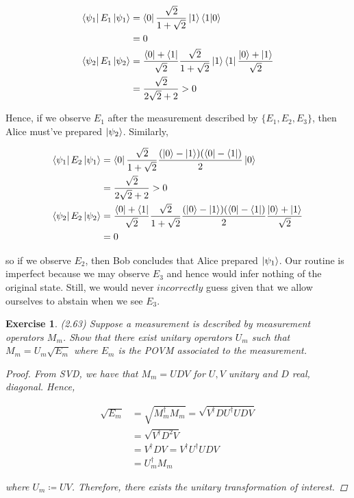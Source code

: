 \documentclass[11pt]{article}
\newcommand\0{\mathbf{0}}
\newcommand\<{\langle}
\renewcommand\>{\rangle}
\newtheorem{exercise}[theorem]{Exercise}
\begin{document}
\begin{align*}
\bra{\psi_1} E_1 \ket{\psi_1} &= \bra{0} \frac{\sqrt{2}}{1+\sqrt{2}}\ket{1}\bra{1}\ket{0} \\
	&= 0 \\
\bra{\psi_2} E_1 \ket{\psi_2} &= \frac{\bra{0} + \bra{1}}{\sqrt{2}}\frac{\sqrt{2}}{1+\sqrt{2}}\ket{1}\bra{1}\frac{\ket{0} + \ket{1}}{\sqrt{2}} \\
	&= \frac{\sqrt{2}}{2\sqrt{2} + 2} > 0 
\end{align*}

Hence, if we observe $E_1$ after the measurement described by $\{ E_1, E_2, E_3 \}$, then Alice must've prepared $\ket{\psi_2}$. Similarly,

\begin{align*}
\bra{\psi_1} E_2 \ket{\psi_1} &= \bra{0} \frac{\sqrt{2}}{1+\sqrt{2}}\frac{(\ket{0} - \ket{1})(\bra{0} - \bra{1})}{2}\ket{0} \\
	&= \frac{\sqrt{2}}{2\sqrt{2} + 2} > 0 \\
\bra{\psi_2} E_2 \ket{\psi_2} &= \frac{\bra{0} + \bra{1}}{\sqrt{2}}\frac{\sqrt{2}}{1+\sqrt{2}}\frac{(\ket{0} - \ket{1})(\bra{0} - \bra{1})}{2}\frac{\ket{0} + \ket{1}}{\sqrt{2}} \\
	&= 0
\end{align*}

so if we observe $E_2$, then Bob concludes that Alice prepared $\ket{\psi_1}$. Our routine is imperfect because we may observe $E_3$ and hence would infer nothing of the original state. Still, we would never $\textit{incorrectly}$ guess given that we allow ourselves to abstain when we see $E_3$. 

\begin{exercise} (2.63) Suppose a measurement is described by measurement operators $M_m$. Show that there exist unitary operators $U_m$ such that $M_m  = U_m\sqrt{E_m}$ where $E_m$ is the POVM associated to the measurement. 

\begin{proof}
From SVD, we have that $M_m = UDV$ for $U,V$ unitary and $D$ real, diagonal. Hence,

\begin{align*}
\sqrt{E_m} &= \sqrt{M_m^\dag M_m} = \sqrt{V^\dag DU^\dag UDV} \\ 	
&= \sqrt{V^\dag D^2V} \\
&= V^\dag DV = V^\dag U^\dag UDV \\
&= U_m^\dag M_m
\end{align*}
 
where $U_m \coloneqq UV$. Therefore, there exists the unitary transformation of interest.

\end{proof}
\end{exercise}
\end{document}
